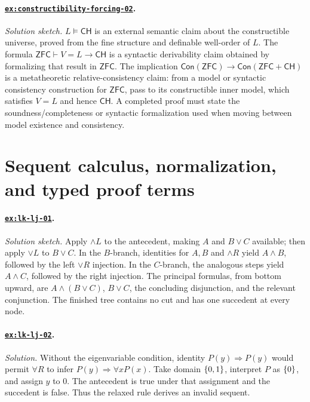 \documentclass[11pt,oneside,openany]{book}
\theoremstyle{definition}
\theoremstyle{plain}
\theoremstyle{remark}
\DeclarePairedDelimiter{\set}{\lbrace}{\rbrace}
\newcommand{\entails}{\models}
\newcommand{\derives}{\vdash}
\newcommand{\ZFC}{\mathsf{ZFC}}
\begin{document}
\paragraph{\hyperref[ex:constructibility-forcing-02]{\texttt{ex:constructibility-forcing-02}}.}
\textit{Solution sketch.}  \(L\entails\mathsf{CH}\) is an external semantic
claim about the constructible universe, proved from the fine structure and
definable well-order of \(L\).  The formula
\(\ZFC\derives V=L\to\mathsf{CH}\) is a syntactic derivability claim obtained
by formalizing that result in \(\ZFC\).  The implication
\(\mathsf{Con}(\ZFC)\to\mathsf{Con}(\ZFC+\mathsf{CH})\) is a
metatheoretic relative-consistency claim: from a model or syntactic consistency
construction for \(\ZFC\), pass to its constructible inner model, which
satisfies \(V=L\) and hence \(\mathsf{CH}\).  A completed proof must state the
soundness/completeness or syntactic formalization used when moving between
model existence and consistency.

\section{Sequent calculus, normalization, and typed proof terms}

\paragraph{\hyperref[ex:lk-lj-01]{\texttt{ex:lk-lj-01}}.}
\textit{Solution sketch.}  Apply \(\land L\) to the antecedent, making
\(A\) and \(B\lor C\) available; then apply \(\lor L\) to \(B\lor C\).  In
the \(B\)-branch, identities for \(A,B\) and \(\land R\) yield
\(A\land B\), followed by the left \(\lor R\) injection.  In the
\(C\)-branch, the analogous steps yield \(A\land C\), followed by the right
injection.  The principal formulas, from bottom upward, are
\(A\land(B\lor C)\), \(B\lor C\), the concluding disjunction, and the
relevant conjunction.  The finished tree contains no cut and has one succedent at every
node.

\paragraph{\hyperref[ex:lk-lj-02]{\texttt{ex:lk-lj-02}}.}
\textit{Solution.}  Without the eigenvariable condition, identity
\(P(y)\Rightarrow P(y)\) would permit \(\forall R\) to infer
\(P(y)\Rightarrow\forall xP(x)\).  Take domain \(\set{0,1}\), interpret
\(P\) as \(\set{0}\), and assign \(y\) to \(0\).  The antecedent is true under
that assignment and the succedent is false.  Thus the relaxed rule derives an
invalid sequent.
\end{document}
